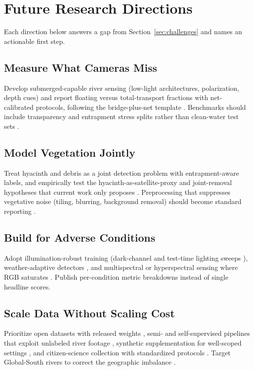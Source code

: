 \documentclass[12pt]{article}
\begin{document}
\section{Future Research Directions}
\label{sec:future}

Each direction below answers a gap from Section~\ref{sec:challenges} and names an actionable first step.

\subsection{Measure What Cameras Miss}
Develop submerged-capable river sensing (low-light architectures, polarization, depth cues) and report floating versus total-transport fractions with net-calibrated protocols, following the bridge-plus-net template \cite{Wolf2022}. Benchmarks should include transparency and entrapment stress splits rather than clean-water test sets \cite{JiaFlux2025}.

\subsection{Model Vegetation Jointly}
Treat hyacinth and debris as a joint detection problem with entrapment-aware labels, and empirically test the hyacinth-as-satellite-proxy and joint-removal hypotheses that current work only proposes \cite{Saigon2025}. Preprocessing that suppresses vegetative noise (tiling, blurring, background removal) should become standard reporting \cite{FrontEnv2025,Nunkhaw2025}.

\subsection{Build for Adverse Conditions}
Adopt illumination-robust training (dark-channel and test-time lighting sweeps \cite{Saddi2024}), weather-adaptive detectors \cite{EAAI2023}, and multispectral or hyperspectral sensing where RGB saturates \cite{Cortesi2022,Tasseron2022}. Publish per-condition metric breakdowns instead of single headline scores.

\subsection{Scale Data Without Scaling Cost}
Prioritize open datasets with released weights \cite{JiaFrontiers2023,Pan2024,JiaFlux2025,Cheng2021}, semi- and self-supervised pipelines that exploit unlabeled river footage \cite{Sun2025,JiaSwAV2024}, synthetic supplementation for well-scoped settings \cite{Pan2023}, and citizen-science collection with standardized protocols \cite{Lieshout2020,Cook2021,RiverWatch2024}. Target Global-South rivers to correct the geographic imbalance \cite{Atuhaire2025}.
\end{document}
